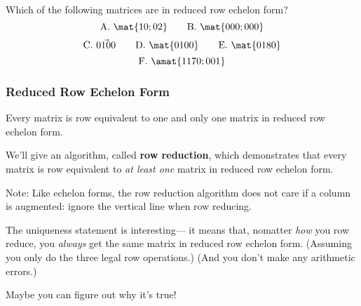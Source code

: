 
\begin{pollframe}

\begin{poll}
\begin{bluebox}[Poll]{.8\textwidth}
  Which of the following matrices are in reduced row echelon form?
  \[ \textrm{A.}~ \mat{1 0; 0 2} \qquad \textrm{B.}~ \mat{0 0 0;0 0 0} \]
  \[ \textrm{C.}~ \vec{0 1 0 0} \qquad \textrm{D.}~ \mat{0 1 0 0} \qquad
  \textrm{E.}~ \mat{0 1 8 0} \]
  \[ \textrm{F.}~ \amat{1 17 0;0 0 1} \]
\end{bluebox}
\end{poll}


\end{pollframe}



\begin{frame}
\frametitle{Reduced Row Echelon Form}

\vskip-3mm
\begin{thm}
  Every matrix is row equivalent to one and only one matrix in reduced row
  echelon form.
\end{thm}

\pause
\bigskip
We'll give an algorithm, called \textbf{row reduction}, which demonstrates that
every matrix is row equivalent to \emph{at least one} matrix in reduced row
echelon form.

\pause
\bigskip
\alert{Note:} Like echelon forms, the row reduction algorithm does not care if a
column is augmented: ignore the vertical line when row reducing.

\pause\bigskip
The uniqueness statement is interesting---%
\pause
it means that, nomatter \emph{how\/} you row reduce, you \emph{always\/} get the
same matrix in reduced row echelon form.
\pause
(Assuming you only do the three legal row operations.)
\pause
(And you don't make any arithmetic errors.)

\pause\bigskip
Maybe you can figure out why it's true!

\end{frame}



